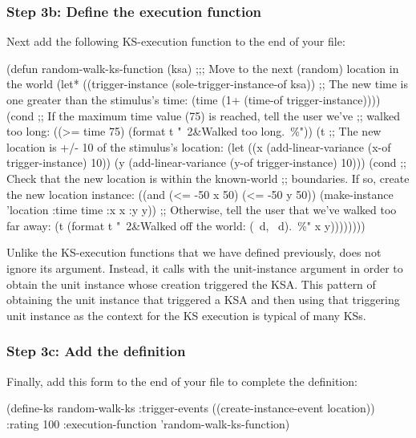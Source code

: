 \documentclass[10pt,twoside,english,pdftex]{article}
\begin{document}
\subsubsection*{Step 3b: Define the  execution function}

Next add the following KS-execution function to the end of your
 file:
%
\W\supp
\begin{example}
  (defun random-walk-ks-function (ksa)
    ;;; Move to the next (random) location in the world
    (let* ((trigger-instance (sole-trigger-instance-of ksa))
           ;; The new time is one greater than the stimulus's time:
           (time (1+ (time-of trigger-instance))))
      (cond
       ;; If the maximum time value (75) is reached, tell the user we've
       ;; walked too long:
       ((>= time 75) (format t "~2&Walked too long.~\%"))
       (t ;; The new location is +/- 10 of the stimulus's location:
        (let ((x (add-linear-variance (x-of trigger-instance) 10))
              (y (add-linear-variance (y-of trigger-instance) 10)))
          (cond
           ;; Check that the new location is within the known-world
           ;; boundaries.  If so, create the new location instance:
           ((and (<= -50 x 50) (<= -50 y 50))
            (make-instance 'location 
              :time time 
              :x x 
              :y y))
           ;; Otherwise, tell the user that we've walked too far away:
           (t (format t "~2\&Walked off the world: (~d, ~d).~\%" x y))))))))
\end{example}

%
%
Unlike the KS-execution functions that we have defined previously,
 does not ignore its  argument.
Instead, it calls  with the 
unit-instance argument in order to obtain the  unit
instance whose creation triggered the KSA.  This pattern of obtaining the unit
instance that triggered a KSA and then using that triggering unit instance as
the context for the KS execution is typical of many KSs.

\subsubsection*{Step 3c: Add the  definition}

Finally, add this  form to the end of your
 file to complete the
 definition:
%
%
%
\W\supp
\begin{example}
  (define-ks random-walk-ks
     :trigger-events ((create-instance-event location))
     :rating 100
     :execution-function 'random-walk-ks-function)
\end{example}
\end{document}

